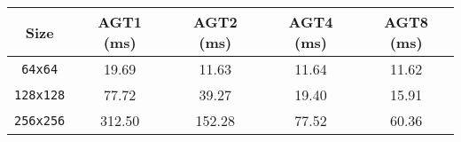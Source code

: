{\small
\begin{tabular}{|c|c|c|c|c|}
    \hline Size & AGT1 (ms) & AGT2 (ms) & AGT4 (ms) & AGT8 (ms) \\
    \hline \verb|64x64| & 19.69 & 11.63 & 11.64 & 11.62 \\
    \verb|128x128| & 77.72 & 39.27 & 19.40 & 15.91 \\
    \verb|256x256| & 312.50 & 152.28 & 77.52 & 60.36 \\
    \hline
\end{tabular}}